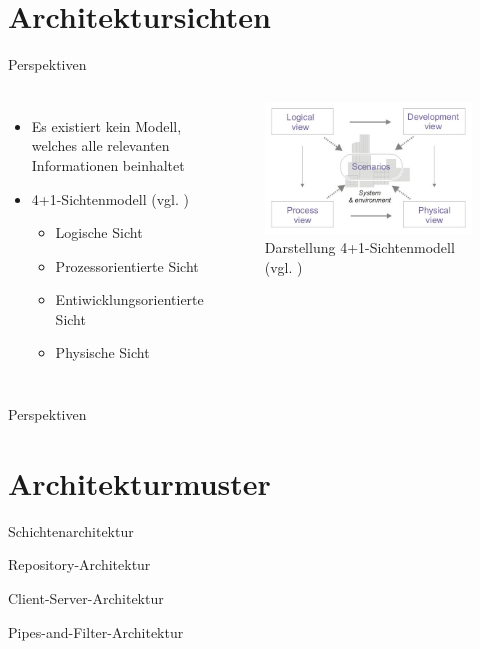 \documentclass{beamer}
\begin{document}
		\section{Architektursichten}
			\begin{frame}{Perspektiven}
				\begin{columns}
				\begin{itemize}
					\item Es existiert kein Modell, welches alle relevanten Informationen beinhaltet
					\item 4+1-Sichtenmodell (vgl. \cite{4+1})
						\begin{itemize}
						\item Logische Sicht
						\item Prozessorientierte Sicht
						\item Entiwicklungsorientierte Sicht
						\item Physische Sicht 
						\end{itemize} 
				\end{itemize}
			   	\begin{figure}
					\includegraphics[width=\textwidth]{4+1.jpg}
					\caption{Darstellung 4+1-Sichtenmodell (vgl. \cite{4+1pic})}
				\end{figure}
			\end{columns}
			\end{frame}
			\begin{frame}{Perspektiven}
		
			\end{frame}
		\section{Architekturmuster}
			\begin{frame}{Schichtenarchitektur}
			
			\end{frame}
			\begin{frame}{Repository-Architektur}
			
			\end{frame}	
			\begin{frame}{Client-Server-Architektur}
			
			\end{frame}
			\begin{frame}{Pipes-and-Filter-Architektur}
			
			\end{frame}	
\end{document}
